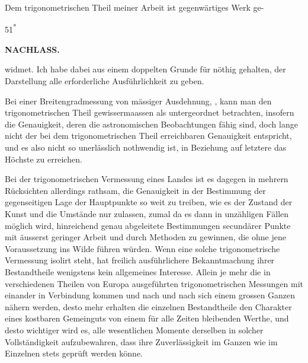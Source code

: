 \par\noindent\hspace*{\parindent}Dem trigonometrischen Theil meiner Arbeit ist gegenwärtiges Werk ge-
\par\smallskip
\noindent\hfill{\small 51\textsuperscript{*}}\hspace*{.122\linewidth}\par\clearpage

\noindent{}\hfill{\small\textbf{NACHLASS.}}\hfill\null\par\medskip
\noindent widmet. Ich habe dabei aus einem doppelten Grunde für nöthig gehalten,
der Darstellung alle erforderliche Ausführlichkeit zu geben.

\par\noindent\hspace*{\parindent}Bei einer  Breitengradmessung von mässiger Ausdehnung,
, kann man den trigonometrischen
Theil gewissermaassen als untergeordnet betrachten, insofern die Genauigkeit,
deren die astronomischen Beobachtungen fähig sind, doch lange
nicht der bei dem trigonometrischen Theil erreichbaren Genauigkeit entspricht,
und es also nicht so unerlässlich nothwendig ist, in Beziehung auf letztere das
Höchste zu erreichen.

\par\noindent\hspace*{\parindent}Bei der trigonometrischen Vermessung eines Landes ist es dagegen in
mehrern Rücksichten allerdings rathsam, die Genauigkeit in der Bestimmung
der gegenseitigen Lage der Hauptpunkte so weit zu treiben, wie es der Zustand
der Kunst und die Umstände nur zulassen, zumal da es dann in unzähligen
Fällen möglich wird, hinreichend genau abgeleitete Bestimmungen
secundärer Punkte mit äusserst geringer Arbeit und durch Methoden zu gewinnen,
die ohne jene Voraussetzung ins Wilde führen würden. Wenn eine solche
trigonometrische Vermessung isolirt steht, hat freilich ausführlichere Bekanntmachung
ihrer Bestandtheile wenigstens kein allgemeines Interesse. Allein
je mehr die in verschiedenen Theilen von Europa ausgeführten trigonometrischen
Messungen mit einander in Verbindung kommen und nach und nach
sich einem grossen Ganzen nähern werden, desto mehr erhalten die einzelnen
Bestandtheile den Charakter eines kostbaren Gemeinguts von einem für alle
Zeiten bleibenden Werthe, und desto wichtiger wird es, alle wesentlichen Momente
derselben in solcher Vollständigkeit aufzubewahren, dass ihre Zuverlässigkeit
im Ganzen wie im Einzelnen stets geprüft werden könne.


